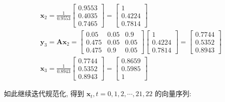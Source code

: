 \documentclass[10pt]{article}
\begin{document}
\begin{CJK*}{UTF8}{bsmi}
$$
\begin{aligned}
& \boldsymbol{x}_{2}=\frac{1}{0.9553}\left[\begin{array}{l}
0.9553 \\
0.4035 \\
0.7465
\end{array}\right]=\left[\begin{array}{l}
1 \\
0.4224 \\
0.7814
\end{array}\right] \\
& \boldsymbol{y}_{3}=\boldsymbol{A} \boldsymbol{x}_{2}=\left[\begin{array}{lll}
0.05 & 0.05 & 0.9 \\
0.475 & 0.05 & 0.05 \\
0.475 & 0.9 & 0.05
\end{array}\right]\left[\begin{array}{l}
1 \\
0.4224 \\
0.7814
\end{array}\right]=\left[\begin{array}{l}
0.7744 \\
0.5352 \\
0.8943
\end{array}\right] \\
& \boldsymbol{x}_{3}=\frac{1}{0.8943}\left[\begin{array}{l}
0.7744 \\
0.5352 \\
0.8943
\end{array}\right]=\left[\begin{array}{l}
0.8659 \\
0.5985 \\
1
\end{array}\right]
\end{aligned}
$$

如此继续迭代规范化, 得到 $\boldsymbol{x}_{t}, t=0,1,2, \cdots, 21,22$ 的向量序列:


\end{CJK*}
\end{document}
